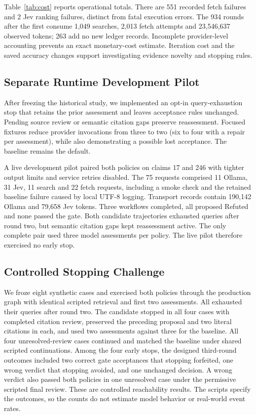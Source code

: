 \documentclass[conference]{IEEEtran}
\begin{document}
Table~\ref{tab:cost} reports operational totals. There are 551 recorded fetch failures and 2 Jev ranking failures, distinct from fatal execution errors. The 934 rounds after the first consume 1,049 searches, 2,013 fetch attempts and 23,546,637 observed tokens; 263 add no new ledger records. Incomplete provider-level accounting prevents an exact monetary-cost estimate. Iteration cost and the saved accuracy changes support investigating evidence novelty and stopping rules.

\subsection{Separate Runtime Development Pilot}
After freezing the historical study, we implemented an opt-in query-exhaustion stop that retains the prior assessment and leaves acceptance rules unchanged. Pending source review or semantic citation gaps preserve reassessment. Focused fixtures reduce provider invocations from three to two (six to four with a repair per assessment), while also demonstrating a possible lost acceptance. The baseline remains the default.

A live development pilot paired both policies on claims 17 and 246 with tighter output limits and service retries disabled. The 75 requests comprised 11 Ollama, 31 Jev, 11 search and 22 fetch requests, including a smoke check and the retained baseline failure caused by local UTF-8 logging. Transport records contain 190,142 Ollama and 79,658 Jev tokens. Three workflows completed, all proposed Refuted and none passed the gate. Both candidate trajectories exhausted queries after round two, but semantic citation gaps kept reassessment active. The only complete pair used three model assessments per policy. The live pilot therefore exercised no early stop.

\subsection{Controlled Stopping Challenge}
We froze eight synthetic cases and exercised both policies through the production graph with identical scripted retrieval and first two assessments. All exhausted their queries after round two. The candidate stopped in all four cases with completed citation review, preserved the preceding proposal and two literal citations in each, and used two assessments against three for the baseline. All four unresolved-review cases continued and matched the baseline under shared scripted continuations. Among the four early stops, the designed third-round outcomes included two correct gate acceptances that stopping forfeited, one wrong verdict that stopping avoided, and one unchanged decision. A wrong verdict also passed both policies in one unresolved case under the permissive scripted final review. These are controlled reachability results. The scripts specify the outcomes, so the counts do not estimate model behavior or real-world event rates.
\end{document}
